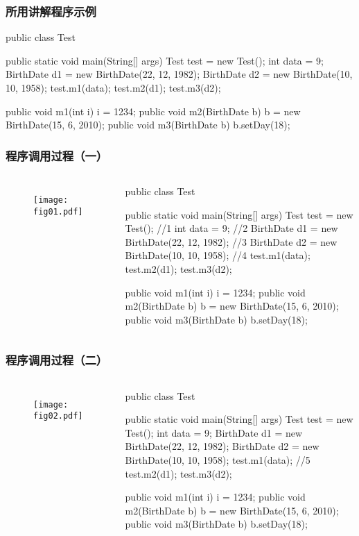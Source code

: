 \begin{frame}[fragile] %
\frametitle{所用讲解程序示例}
\begin{javaCode}
public class Test {
  public static void main(String[] args) {
    Test test = new Test();
    int data = 9;
    BirthDate d1 = new BirthDate(22, 12, 1982);
    BirthDate d2 = new BirthDate(10, 10, 1958);
    test.m1(data);
    test.m2(d1);
    test.m3(d2);
  }

  public void m1(int i) {
    i = 1234;
  }
  public void m2(BirthDate b) {
    b = new BirthDate(15, 6, 2010);
  }
  public void m3(BirthDate b) {
    b.setDay(18);
  }
}
\end{javaCode}
\end{frame}

\begin{frame}[fragile] %
\frametitle{程序调用过程（一）}

\begin{columns}
\begin{figure}
\centering
\texttt{[image: fig01.pdf]}
\end{figure}

\begin{javaCode}\small
public class Test {
  public static void main(String[] args) {
    Test test = new Test(); //1
    int data = 9; //2
    BirthDate d1 = new BirthDate(22, 12, 1982); //3
    BirthDate d2 = new BirthDate(10, 10, 1958); //4
    test.m1(data);
    test.m2(d1);
    test.m3(d2);
  }

  public void m1(int i) {
    i = 1234;
  }
  public void m2(BirthDate b) {
    b = new BirthDate(15, 6, 2010);
  }
  public void m3(BirthDate b) {
    b.setDay(18);
  }
}
\end{javaCode}
\end{columns}
\end{frame}



\begin{frame}[fragile] %
\frametitle{程序调用过程（二）}

\begin{columns}
\begin{figure}
\centering
\texttt{[image: fig02.pdf]}
\end{figure}

\begin{javaCode}\small
public class Test {
  public static void main(String[] args) {
    Test test = new Test(); 
    int data = 9; 
    BirthDate d1 = new BirthDate(22, 12, 1982); 
    BirthDate d2 = new BirthDate(10, 10, 1958); 
    test.m1(data); //5
    test.m2(d1);
    test.m3(d2);
  }

  public void m1(int i) {
    i = 1234;
  }
  public void m2(BirthDate b) {
    b = new BirthDate(15, 6, 2010);
  }
  public void m3(BirthDate b) {
    b.setDay(18);
  }
}
\end{javaCode}
\end{columns}
\end{frame}



